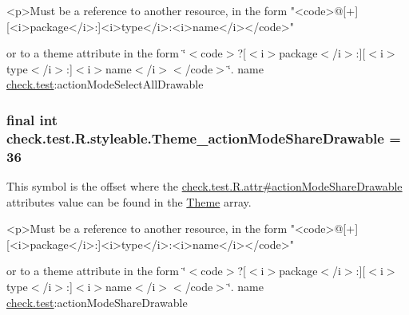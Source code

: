 \begin{DoxyVerb}      <p>Must be a reference to another resource, in the form "<code>@[+][<i>package</i>:]<i>type</i>:<i>name</i></code>"
\end{DoxyVerb}
 or to a theme attribute in the form \char`\"{}$<$code$>$?\mbox{[}$<$i$>$package$<$/i$>$\+:\mbox{]}\mbox{[}$<$i$>$type$<$/i$>$\+:\mbox{]}$<$i$>$name$<$/i$>$$<$/code$>$\char`\"{}.  name \hyperlink{namespacecheck_1_1test}{check.\+test}\+:action\+Mode\+Select\+All\+Drawable \hypertarget{classcheck_1_1test_1_1_r_1_1styleable_a834d173801ca8819888d149a2adb6a9e}{}
\subsubsection[{Theme\+\_\+action\+Mode\+Share\+Drawable}]{\setlength{\rightskip}{0pt plus 5cm}final int check.\+test.\+R.\+styleable.\+Theme\+\_\+action\+Mode\+Share\+Drawable = 36\hspace{0.3cm}{\ttfamily [static]}}\label{classcheck_1_1test_1_1_r_1_1styleable_a834d173801ca8819888d149a2adb6a9e}
This symbol is the offset where the \hyperlink{classcheck_1_1test_1_1_r_1_1attr_ac472f4499bff65d116305db33c9635a7}{check.\+test.\+R.\+attr\#action\+Mode\+Share\+Drawable} attribute\textquotesingle{}s value can be found in the \hyperlink{classcheck_1_1test_1_1_r_1_1styleable_acca726d02016a0cf607782ec3a436a81}{Theme} array.

\begin{DoxyVerb}      <p>Must be a reference to another resource, in the form "<code>@[+][<i>package</i>:]<i>type</i>:<i>name</i></code>"
\end{DoxyVerb}
 or to a theme attribute in the form \char`\"{}$<$code$>$?\mbox{[}$<$i$>$package$<$/i$>$\+:\mbox{]}\mbox{[}$<$i$>$type$<$/i$>$\+:\mbox{]}$<$i$>$name$<$/i$>$$<$/code$>$\char`\"{}.  name \hyperlink{namespacecheck_1_1test}{check.\+test}\+:action\+Mode\+Share\+Drawable \hypertarget{classcheck_1_1test_1_1_r_1_1styleable_a8f38579426c6d3ff9440e1e2dce58bc6}{}
